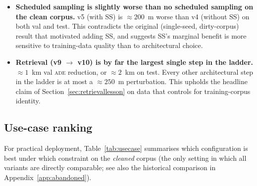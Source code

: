 \documentclass[oneside, a4paper, onecolumn, 11pt]{article}
\newcommand{\ade}{\textsc{ade}}
\begin{document}
\begin{itemize}[leftmargin=*]
  \item \textbf{Scheduled sampling is slightly worse than no
        scheduled sampling on the clean corpus.}  v5 (with SS) is
        $\approx 200$~m worse than v4 (without SS) on both val and
        test.  This contradicts the original (single-seed,
        dirty-corpus) result that motivated adding SS, and suggests
        SS's marginal benefit is more sensitive to training-data
        quality than to architectural choice.
  \item \textbf{Retrieval (v9 $\to$ v10) is by far the largest
        single step in the ladder.}  $\approx 1$~km val \ade{}
        reduction, or $\approx 2$~km on test.  Every other
        architectural step in the ladder is at most a
        $\approx 250$~m perturbation.  This upholds the headline
        claim of Section~\ref{sec:retrievallesson} on data that
        controls for training-corpus identity.
\end{itemize}

\subsection{Use-case ranking}

For practical deployment, Table~\ref{tab:usecase} summarises which
configuration is best under which constraint on the \emph{cleaned}
corpus (the only setting in which all variants are directly
comparable; see also the historical comparison in
Appendix~\ref{app:abandoned}).
\end{document}
